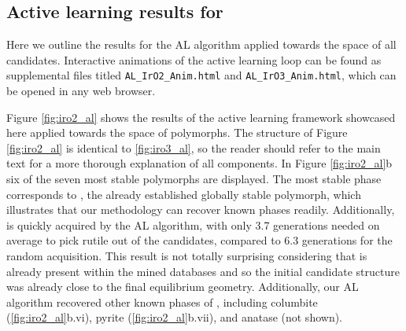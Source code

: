 \subsection{Active learning results for \IrOtwo}

%
%
Here we outline the results for the AL algorithm applied towards the space of all \IrOtwo candidates.
%
Interactive animations of the active learning loop can be found as supplemental files titled
\texttt{AL\_IrO2\_Anim.html}
and
\texttt{AL\_IrO3\_Anim.html},
which can be opened in any web browser.


%
Figure \ref{fig:iro2_al} shows the results of the active learning framework showcased here applied towards the space of \IrOtwo polymorphs.
%
The structure of Figure \ref{fig:iro2_al} is identical to \ref{fig:iro3_al},
so the reader should refer to the main text for a more thorough explanation of all components.
%
In Figure \ref{fig:iro2_al}b six of the seven most stable \IrOtwo polymorphs are displayed.
%
The most stable phase corresponds to \rIrOtwo, the already established globally stable \IrOtwo polymorph,
which illustrates that our methodology can recover known phases readily.
%
Additionally, \rIrOtwo is quickly acquired by the AL algorithm,
with only \num{3.7} generations needed on average to pick rutile out of the candidates,
compared to 6.3 generations for the random acquisition.
%
This result is not totally surprising considering that \rIrOtwo is already present within the mined databases and so the initial candidate structure was already close to the final equilibrium geometry.
%
Additionally, our AL algorithm recovered other known phases of \IrOtwo, including columbite (\ref{fig:iro2_al}b.vi), pyrite (\ref{fig:iro2_al}b.vii), and anatase (not shown).


